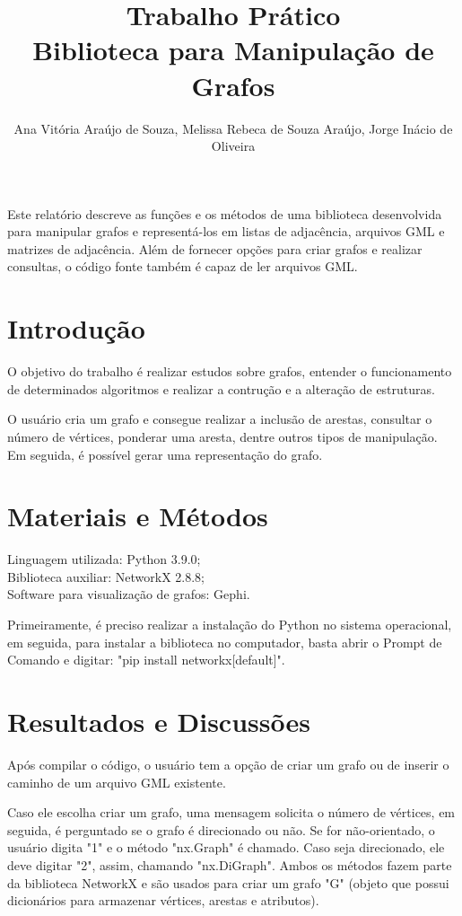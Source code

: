 \documentclass[12pt]{article}
\title{Trabalho Prático\\ Biblioteca para Manipulação de Grafos}
\author{Ana Vitória Araújo de Souza, Melissa Rebeca de Souza Araújo, Jorge Inácio de Oliveira}
\begin{document}
 

\maketitle

\begin{resumo} 
   Este relatório descreve as funções e os métodos de uma biblioteca desenvolvida para manipular grafos e representá-los em listas de adjacência, arquivos GML e matrizes de adjacência. Além de fornecer opções para criar grafos e realizar consultas, o código fonte também é capaz de ler arquivos GML.
\end{resumo}


\section{Introdução} \label{sec:firstpage}

O objetivo do trabalho é realizar estudos sobre grafos, entender o funcionamento de determinados algoritmos e realizar a contrução e a alteração de estruturas.

O usuário cria um grafo e consegue realizar a inclusão de arestas, consultar o número de vértices, ponderar uma aresta, dentre outros tipos de manipulação. Em seguida, é possível gerar uma representação do grafo.

\section{Materiais e Métodos}

Linguagem utilizada: Python 3.9.0;\\ 
Biblioteca auxiliar: NetworkX 2.8.8;\\
Software para visualização de grafos: Gephi.

Primeiramente, é preciso realizar a instalação do Python no sistema operacional, em seguida, para instalar a biblioteca no computador, basta abrir o Prompt de Comando e digitar: "pip install networkx[default]".

\section{Resultados e Discussões}

Após compilar o código, o usuário tem a opção de criar um grafo ou de inserir o caminho de um arquivo GML existente.

Caso ele escolha criar um grafo, uma mensagem solicita o número de vértices, em seguida, é perguntado se o grafo é direcionado ou não. Se for não-orientado, o usuário digita "1" e o método "nx.Graph" é chamado. Caso seja direcionado, ele deve digitar "2", assim, chamando "nx.DiGraph". Ambos os métodos fazem parte da biblioteca NetworkX e são usados para criar um grafo "G" (objeto que possui dicionários para armazenar vértices, arestas e atributos).
\end{document}
